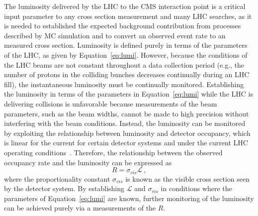 The luminosity delivered by the LHC to the CMS interaction point is a critical
input parameter to any cross section measurement and many LHC searches, as it 
is needed to established the expected background contribution from processes
described by MC simulation and to convert an observed event rate to an measured
cross section. Luminosity is defined purely in terms of the parameters of the 
LHC, as given by Equation~\ref{eq:lumi}. However, because the conditions of the LHC beams
are not constant throughout a data collection period (e.g., the number of protons
in the colliding bunches decreases continually during an LHC fill),
the instantaneous luminosity must be continually monitored. Establishing
the luminosity in terms of the parameters in Equation~\ref{eq:lumi} while the LHC
is delivering collisions is unfavorable
because measurements of the beam parameters, such as the beam widths,
cannot be made to high precision without interfering with the beam conditions.
Instead, the luminosity can be monitored by exploiting the relationship between
luminosity and detector occupancy, which is linear for the current for
certain detector systems and under the current LHC operating conditions~\cite{CMS-PAS-LUM-13-001}.
Therefore, the relationship between the observed occupancy 
rate and the luminosity can be expressed as
\begin{equation}
  R = \sigma_{vis}\mathcal{L}\,,
  \label{eq:lumiRate}
\end{equation}
where the proportionality constant $\sigma_{vis}$ is known as the visible cross
section seen by the detector system. By establishing $\mathcal{L}$ and $\sigma_{vis}$
in conditions where the parameters of Equation~\ref{eq:lumi} are known, further monitoring
of the luminosity can be achieved purely via a measurements of the $R$.

